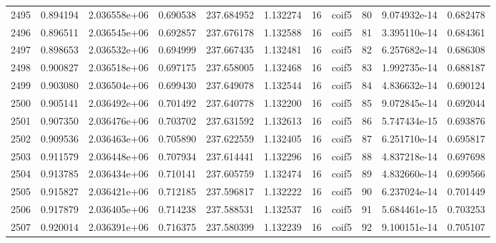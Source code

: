 \begin{tabular}{lrrrrrrlrrr}
2495 &    0.894194 &        2.036558e+06 &  0.690538 &              237.684952 &    1.132274 &      16 &        coif5 &     80 &   9.074932e-14 &      0.682478 \\
2496 &    0.896511 &        2.036545e+06 &  0.692857 &              237.676178 &    1.132588 &      16 &        coif5 &     81 &   3.395110e-14 &      0.684361 \\
2497 &    0.898653 &        2.036532e+06 &  0.694999 &              237.667435 &    1.132481 &      16 &        coif5 &     82 &   6.257682e-14 &      0.686308 \\
2498 &    0.900827 &        2.036518e+06 &  0.697175 &              237.658005 &    1.132468 &      16 &        coif5 &     83 &   1.992735e-14 &      0.688187 \\
2499 &    0.903080 &        2.036504e+06 &  0.699430 &              237.649078 &    1.132544 &      16 &        coif5 &     84 &   4.836632e-14 &      0.690124 \\
2500 &    0.905141 &        2.036492e+06 &  0.701492 &              237.640778 &    1.132200 &      16 &        coif5 &     85 &   9.072845e-14 &      0.692044 \\
2501 &    0.907350 &        2.036476e+06 &  0.703702 &              237.631592 &    1.132613 &      16 &        coif5 &     86 &   5.747434e-15 &      0.693876 \\
2502 &    0.909536 &        2.036463e+06 &  0.705890 &              237.622559 &    1.132405 &      16 &        coif5 &     87 &   6.251710e-14 &      0.695817 \\
2503 &    0.911579 &        2.036448e+06 &  0.707934 &              237.614441 &    1.132296 &      16 &        coif5 &     88 &   4.837218e-14 &      0.697698 \\
2504 &    0.913785 &        2.036434e+06 &  0.710141 &              237.605759 &    1.132474 &      16 &        coif5 &     89 &   4.832660e-14 &      0.699566 \\
2505 &    0.915827 &        2.036421e+06 &  0.712185 &              237.596817 &    1.132222 &      16 &        coif5 &     90 &   6.237024e-14 &      0.701449 \\
2506 &    0.917879 &        2.036405e+06 &  0.714238 &              237.588531 &    1.132537 &      16 &        coif5 &     91 &   5.684461e-15 &      0.703253 \\
2507 &    0.920014 &        2.036391e+06 &  0.716375 &              237.580399 &    1.132239 &      16 &        coif5 &     92 &   9.100151e-14 &      0.705107 \\

\end{tabular}
